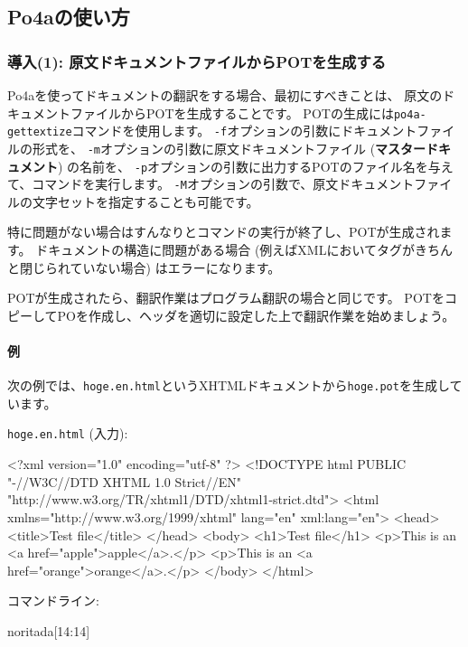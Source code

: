 \documentclass[mingoth,a4paper]{jsarticle}
\begin{document}
\subsection{Po4aの使い方}

\subsubsection{導入(1): 原文ドキュメントファイルからPOTを生成する}

Po4aを使ってドキュメントの翻訳をする場合、最初にすべきことは、
原文のドキュメントファイルからPOTを生成することです。
POTの生成には\texttt{po4a-gettextize}コマンドを使用します。
\texttt{-f}オプションの引数にドキュメントファイルの形式を、
\texttt{-m}オプションの引数に原文ドキュメントファイル ({\bf マスタードキュメント}) の名前を、
\texttt{-p}オプションの引数に出力するPOTのファイル名を与えて、コマンドを実行します。
\texttt{-M}オプションの引数で、原文ドキュメントファイルの文字セットを指定することも可能です。

特に問題がない場合はすんなりとコマンドの実行が終了し、POTが生成されます。
ドキュメントの構造に問題がある場合 (例えばXMLにおいてタグがきちんと閉じられていない場合) はエラーになります。

POTが生成されたら、翻訳作業はプログラム翻訳の場合と同じです。
POTをコピーしてPOを作成し、ヘッダを適切に設定した上で翻訳作業を始めましょう。

\paragraph{例}
次の例では、\texttt{hoge.en.html}というXHTMLドキュメントから\texttt{hoge.pot}を生成しています。

\texttt{hoge.en.html} (入力):

\begin{commandline}
<?xml version="1.0" encoding="utf-8" ?>
<!DOCTYPE html PUBLIC "-//W3C//DTD XHTML 1.0 Strict//EN"
"http://www.w3.org/TR/xhtml1/DTD/xhtml1-strict.dtd">
<html xmlns="http://www.w3.org/1999/xhtml" lang="en" xml:lang="en">
<head>
<title>Test file</title>
</head>
<body>
<h1>Test file</h1>
<p>This is an <a href="apple">apple</a>.</p>
<p>This is an <a href="orange">orange</a>.</p>
</body>
</html>
\end{commandline}

コマンドライン:

\begin{commandline}
noritada[14:14]%
\end{commandline}
\end{document}
